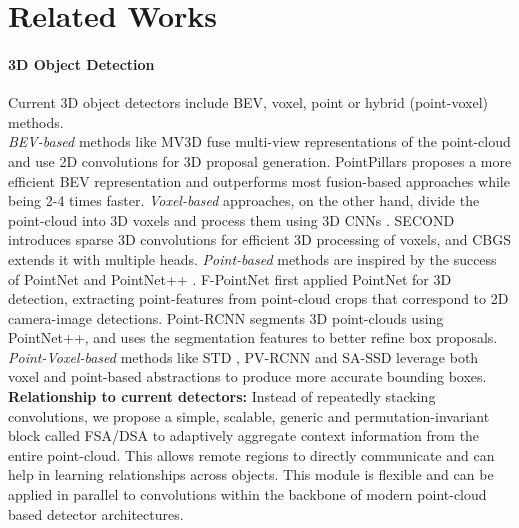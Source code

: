\documentclass[10pt,twocolumn,letterpaper]{article}
\begin{document}
 \section{Related Works}
\paragraph{3D Object Detection} Current 3D object detectors include BEV, voxel, point or hybrid (point-voxel) methods.
\\\textit{BEV-based} methods like MV3D \cite{MV3D} fuse multi-view representations of the point-cloud and use 2D convolutions for 3D proposal generation. PointPillars \cite{pointpillars} proposes a more efficient BEV representation and outperforms most fusion-based approaches while being 2-4 times faster. \textit{Voxel-based} approaches, on the other hand, divide the point-cloud into 3D voxels and process them using 3D CNNs \cite{Voxelnet}. SECOND \cite{SECOND} introduces sparse 3D convolutions for efficient 3D processing of voxels, and CBGS \cite{cbgs} extends it with multiple heads. \textit{Point-based} methods are inspired by the success of PointNet \cite{pointnet} and PointNet++ \cite{pointnetplusplus}. F-PointNet \cite{F-PointNet}  first applied PointNet for 3D detection, extracting point-features from point-cloud crops that correspond to 2D camera-image detections. Point-RCNN \cite{PointRCNN} segments 3D point-clouds using PointNet++, and uses the segmentation features to better refine box proposals. \textit{Point-Voxel-based} methods like STD \cite{STD}, PV-RCNN \cite{PVRCNN} and SA-SSD \cite{sa-ssd} leverage both voxel and point-based abstractions to produce more accurate bounding boxes. 
\\ \textbf{Relationship to current detectors:} Instead of repeatedly stacking convolutions, we propose a simple, scalable, generic and permutation-invariant block called FSA/DSA to adaptively aggregate context information from the entire point-cloud. This allows remote regions to directly communicate and can help in learning relationships across objects. This module is flexible and can be applied in parallel to convolutions within the backbone of modern point-cloud based detector architectures. 

\vspace{-0.5cm}
\end{document}
